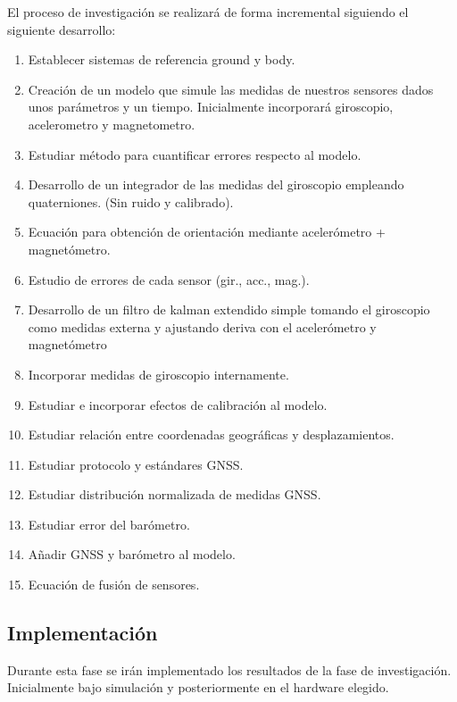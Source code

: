 \documentclass{sty/propuesta}
\begin{document}
El proceso de investigación se realizará de forma incremental siguiendo el siguiente desarrollo:

\begin{enumerate}
    \item Establecer sistemas de referencia ground y body. \cite[sec.~1.2 - 1.4]{gomez2012mecanica}
    \item Creación de un modelo que simule las medidas de nuestros sensores dados unos parámetros y un tiempo. Inicialmente incorporará giroscopio, acelerometro y magnetometro.
    \item Estudiar método para cuantificar errores respecto al modelo.
    \item Desarrollo de un integrador de las medidas del giroscopio empleando quaterniones. (Sin ruido y calibrado). \cite{AshwinNarayan2017Sep}
    \item Ecuación para obtención de orientación mediante acelerómetro + magnetómetro.
    \item Estudio de errores de cada sensor (gir., acc., mag.).
    \item Desarrollo de un filtro de kalman extendido simple tomando el giroscopio como medidas externa y ajustando deriva con el acelerómetro y magnetómetro \cite{PyAHRSdocs}
    \item Incorporar medidas de giroscopio internamente.
    \item Estudiar e incorporar efectos de calibración al modelo.
    \item Estudiar relación entre coordenadas geográficas y desplazamientos.
    \item Estudiar protocolo y estándares GNSS.
    \item Estudiar distribución normalizada de medidas GNSS.
    \item Estudiar error del barómetro.
    \item Añadir GNSS y barómetro al modelo.
    \item Ecuación de fusión de sensores.\cite{Becker_2023}
\end{enumerate}

\subsection{Implementación}

Durante esta fase se irán implementado los resultados de la fase de investigación. Inicialmente bajo simulación y posteriormente en el hardware elegido.
\end{document}
